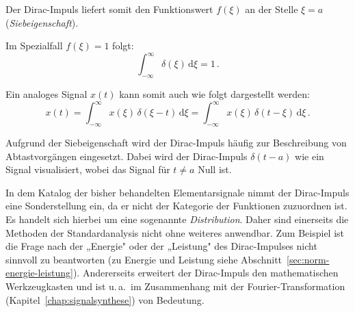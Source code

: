 Der Dirac-Impuls liefert somit den Funktionswert $f(\xi)$ an der Stelle $\xi = a$
(\textit{Siebeigenschaft}).


Im Spezialfall $f(\xi) = 1$ folgt:
$$
  \int_{-\infty}^{\infty} \delta(\xi)\,\mathrm{d}\xi = 1\,.
$$

Ein analoges Signal $x(t)$ kann somit auch wie folgt dargestellt werden:
$$
  x(t) = \int_{-\infty}^{\infty} x(\xi)\,\delta(\xi - t)\,\mathrm{d}\xi
        = \int_{-\infty}^{\infty} x(\xi)\,\delta(t - \xi)\,\mathrm{d}\xi\,.
$$

Aufgrund der Siebeigenschaft wird der Dirac-Impuls häufig zur Beschreibung von
Abtastvorgängen eingesetzt. Dabei wird der Dirac-Impuls $\delta(t-a)$ wie ein
Signal visualisiert, wobei das Signal für $t \neq a$ Null ist.

\begin{bemerkung}
In dem Katalog der bisher behandelten Elementarsignale nimmt der Dirac-Impuls eine Sonderstellung ein, da er nicht der Kategorie der Funktionen zuzuordnen ist. Es handelt sich hierbei um eine sogenannte \textit{Distribution}. Daher sind einerseits die Methoden der Standardanalysis nicht ohne weiteres anwendbar. Zum Beispiel ist die Frage nach der „Energie" oder der „Leistung" des Dirac-Impulses nicht sinnvoll zu beantworten (zu Energie und Leistung siehe Abschnitt~\ref{sec:norm-energie-leistung}). Andererseits erweitert der Dirac-Impuls den mathematischen Werkzeugkasten und ist u.\,a.\ im Zusammenhang mit der Fourier-Transformation (Kapitel~\ref{chap:signalsynthese}) von Bedeutung.
\end{bemerkung}

\begin{center}
\end{center}

